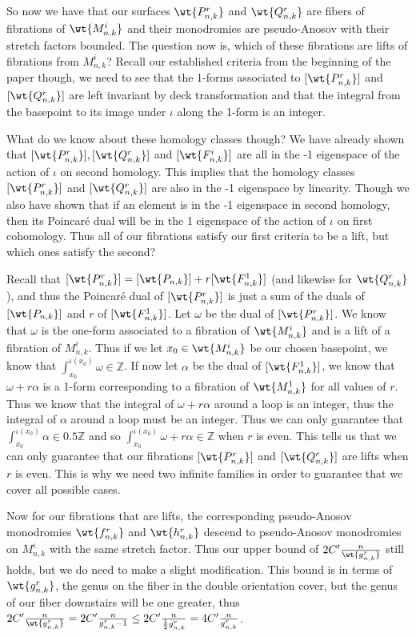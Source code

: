 So now we have that our surfaces $\wt{P^r_{n,k}}$ and $\wt{Q^r_{n,k}}$ are fibers of fibrations of $\wt{M^i_{n,k}}$ and their monodromies are pseudo-Anosov with their stretch factors bounded. The question now is, which of these fibrations are lifts of fibrations from $M^i_{n,k}$? Recall our established criteria from the beginning of the paper though, we need to see that the 1-forms associated to $[\wt{P^r_{n,k}}]$ and $[\wt{Q^r_{n,k}}]$ are left invariant by deck transformation and that the integral from the basepoint to its image under $\iota$ along the 1-form is an integer. 

What do we know about these homology classes though? We have already shown that $[\wt{P^r_{n,k}}],[\wt{Q^r_{n,k}}]$ and $[\wt{F^i_{n,k}}]$ are all in the -1 eigenspace of the action of $\iota$ on second homology. This implies that the homology classes $[\wt{P^r_{n,k}}]$ and $[\wt{Q^r_{n,k}}]$ are also in the -1 eigenspace by linearity. Though we also have shown that if an element is in the -1 eigenspace in second homology, then its Poincar\'e dual will be in the 1 eigenspace of the action of $\iota$ on first cohomology. Thus all of our fibrations satisfy our first criteria to be a lift, but which ones satisfy the second?  

Recall that $[\wt{P^r_{n,k}}] = [\wt{P_{n,k}}] + r[\wt{F^1_{n,k}}]$ (and likewise for $\wt{Q^r_{n,k}}$), and thus the Poincar\'e dual of $[\wt{P^r_{n,k}}]$ is just a sum of the duals of $[\wt{P_{n,k}}]$ and $r$ of $[\wt{F^1_{n,k}}]$. Let $\omega$ be the dual of $[\wt{P^r_{n,k}}]$. We know that $\omega$ is the one-form associated to a fibration of $\wt{M^i_{n,k}}$ and is a lift of a fibration of $M^i_{n,k}$. Thus if we let $x_0 \in \wt{M^i_{n,k}}$ be our chosen basepoint, we know that $\int_{x_0}^{\iota(x_0)} \omega \in \mathbb{Z}$. If now let $\alpha$ be the dual of $[\wt{F^1_{n,k}}]$, we know that $\omega + r\alpha$ is a 1-form corresponding to a fibration of $\wt{M^1_{n,k}}$ for all values of $r$. Thus we know that the integral of $\omega + r\alpha$ around a loop is an integer, thus the integral of $\alpha$ around a loop must be an integer. Thus we can only guarantee that $\int_{x_0}^{\iota(x_0)} \alpha \in 0.5\mathbb{Z}$ and so $\int_{x_0}^{\iota(x_0)} \omega + r\alpha \in \mathbb{Z}$ when $r$ is even. This tells us that we can only guarantee that our fibrations $[\wt{P^r_{n,k}}]$ and $[\wt{Q^r_{n,k}}]$ are lifts when $r$ is even. This is why we need two infinite families in order to guarantee that we cover all possible cases.

Now for our fibrations that are lifts, the corresponding pseudo-Anosov monodromies $\wt{f^r_{n,k}}$ and $\wt{h^r_{n,k}}$ descend to pseudo-Anosov monodromies on $M^i_{n,k}$ with the same stretch factor. Thus our upper bound of $2C'\frac{n}{\wt{g^{r}_{n,k}}}$ still holds, but we do need to make a slight modification. This bound is in terms of $\wt{g^r_{n,k}}$, the genus on the fiber in the double orientation cover, but the genus of our fiber downstairs will be one greater, thus $2C'\frac{n}{\wt{g^r_{n,k}}} = 2C'\frac{n}{g^r_{n,k} - 1} \leq 2C'\frac{n}{\frac{1}{2}g^r_{n,k}} = 4C'\frac{n}{g^r_{n,k}}$.

